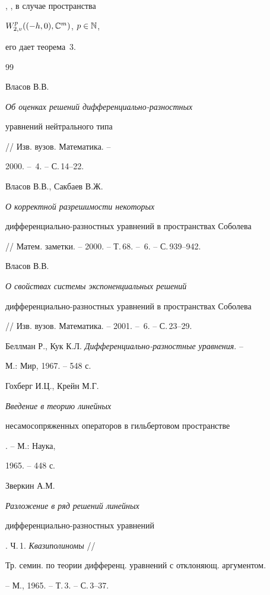 \cite{11}, \cite{16}, в случае пространства 


$W^p_{2,v}((-h,0),\Bbb C^m)$, $p\in\Bbb N$, 


его дает теорема~3. 


 


\begin{thebibliography}{99} 


 




Власов В.В. {\em Об оценках решений дифференциально-разностных 


уравнений нейтрального типа} // Изв. вузов. Математика. -- 


2000. -- \No\,4. -- С.\,14--22. 




Власов В.В., Сакбаев В.Ж. {\em О корректной разрешимости некоторых 


дифференциально-разностных уравнений в пространствах Соболева} 


// Матем. заметки. -- 2000. -- Т.\,68. -- \No\,6. -- С.\,939--942. 




Власов В.В. {\em О свойствах системы экспоненциальных решений 


диф\-фе\-рен\-ци\-аль\-но-разностных уравнений в пространствах Соболева} 


// Изв. вузов. Математика. -- 2001. -- \No\,6. -- С.\,23--29. 




Беллман Р., Кук К.Л. {\em Дифференциально-разностные уравнения}. -- 


М.: Мир, 1967. -- 548 с. 




Гохберг И.Ц., Крейн М.Г. {\em Введение в теорию линейных 


несамосопряженных операторов в гильбертовом пространстве}. -- М.: Наука, 


1965. -- 448 с. 




Зверкин А.М. {\em Разложение в ряд решений линейных 


дифференциально-разностных уравнений}. Ч.\,1. {\em Квазиполиномы} // 


Тр. семин. по теории дифференц. уравнений с отклоняющ. аргументом. 


-- М., 1965. -- Т.\,3. -- С.\,3--37. 



\end{thebibliography}
